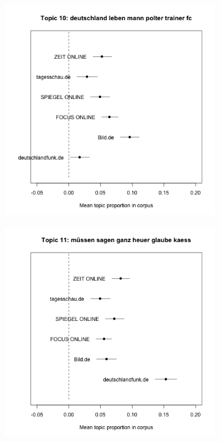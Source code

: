 \documentclass[12pt,a4paper,notitlepage]{article}
\begin{document}
\begin{figure}[H]
\begin{center}
\begin{subfigure}[normla]{0.2\textwidth}
		\end{subfigure}
		\begin{subfigure}[normla]{0.2\textwidth}
			\includegraphics[width=\textwidth]{../figs/estimate_effect10.png}
		\end{subfigure}
		\begin{subfigure}[normla]{0.2\textwidth}
			\includegraphics[width=\textwidth]{../figs/estimate_effect11.png}

\end{subfigure}
\end{center}
\end{figure}
\end{document}
